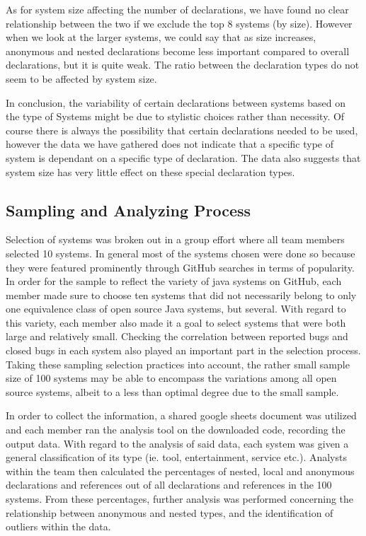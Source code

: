 \documentclass[12p]{article}
\begin{document}
As for system size affecting the number of declarations, we have found no clear relationship between the two if we exclude the top 8 systems (by size). However when we look at the larger systems, we could say that as size increases, anonymous and nested declarations become less important compared to overall declarations, but it is quite weak. The ratio between the declaration types do not seem to be affected by system size.

In conclusion, the variability of certain declarations between systems based on the type of Systems might be due to stylistic choices rather than necessity. Of course there is always the possibility that certain declarations needed to be used, however the data we have gathered does not indicate that a specific type of system is dependant on a specific type of declaration. The data also suggests that system size has very little effect on these special declaration types.

\subsection{Sampling and Analyzing Process}


Selection of systems was broken out in a group effort where all team members selected 10 systems. In general most of the systems chosen were done so because they were featured prominently through GitHub searches in terms of popularity. In order for the sample to reflect the variety of java systems on GitHub, each member made sure to choose ten systems that did not necessarily belong to only one equivalence class of open source Java systems, but several. With regard to this variety, each member also made it a goal to select systems that were both large and relatively small. Checking the correlation between reported bugs and closed bugs in each system also played an important part in the selection process. Taking these sampling selection practices into account, the rather small sample size of 100 systems may be able to encompass the variations among all open source systems, albeit to a less than optimal degree due to the small sample.

In order to collect the information, a shared google sheets document was utilized and each member ran the analysis tool on the downloaded code, recording the output data. With regard to the analysis of said data, each system was given a general classification of its type (ie. tool, entertainment, service etc.). Analysts within the team then calculated the percentages of nested, local and anonymous declarations and references out of all declarations and references in the 100 systems. From these percentages, further analysis was performed concerning the relationship between anonymous and nested types, and the identification of outliers within the data.
\end{document}
